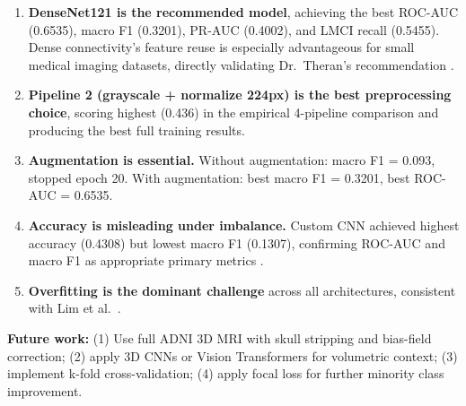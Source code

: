 \documentclass[12pt, a4paper]{article}
\begin{document}
\begin{enumerate}
    \item \textbf{DenseNet121 is the recommended model},
    achieving the best ROC-AUC (0.6535), macro F1
    (0.3201), PR-AUC (0.4002), and LMCI recall (0.5455).
    Dense connectivity's feature reuse is especially
    advantageous for small medical imaging datasets,
    directly validating Dr.\ Theran's recommendation
    \cite{theran2026cnn}.

    \item \textbf{Pipeline 2 (grayscale + normalize
    224px) is the best preprocessing choice}, scoring
    highest (0.436) in the empirical 4-pipeline
    comparison and producing the best full training
    results.

    \item \textbf{Augmentation is essential.} Without
    augmentation: macro F1 = 0.093, stopped epoch 20.
    With augmentation: best macro F1 = 0.3201,
    best ROC-AUC = 0.6535.

    \item \textbf{Accuracy is misleading under
    imbalance.} Custom CNN achieved highest accuracy
    (0.4308) but lowest macro F1 (0.1307), confirming
    ROC-AUC and macro F1 as appropriate primary metrics
    \cite{theran2026metrics}.

    \item \textbf{Overfitting is the dominant challenge}
    across all architectures, consistent with Lim et al.\
    \cite{lim2022}.
\end{enumerate}

\textbf{Future work:} (1) Use full ADNI 3D MRI with
skull stripping and bias-field correction; (2) apply
3D CNNs or Vision Transformers for volumetric context;
(3) implement k-fold cross-validation; (4) apply focal
loss for further minority class improvement.
\end{document}
